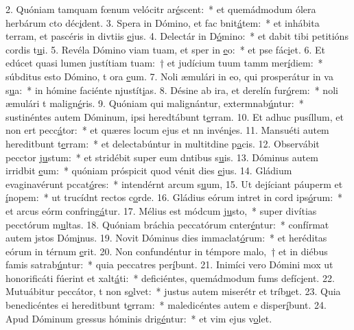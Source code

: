2. Quóniam tamquam fœnum velócitr ar\uline{é}scent:~* et quemádmodum ólera herbárum cto déc\uline{i}dent.
3. Spera in Dómino, et fac bnit\uline{á}tem:~* et inhábita terram, et pascéris in divtiis \uline{e}jus.
4. Delectár in D\uline{ó}mino:~* et dabit tibi petitións cordis t\uline{u}i.
5. Revéla Dómino viam tuam, et sper in \uline{e}o:~* et pse fác\uline{i}et.
6. Et edúcet quasi lumen justítiam tuam:~† et judícium tuum tamm mer\uline{í}diem:~* súbditus esto Dómino, t ora \uline{e}um.
7. Noli æmulári in eo, qui prosperátur in va s\uline{u}a:~* in hómine faciénte njustít\uline{i}as.
8. Désine ab ira, et derelín fur\uline{ó}rem:~* noli æmulári t malign\uline{é}ris.
9. Quóniam qui malignántur, extermnab\uline{ú}ntur:~* sustinéntes autem Dóminum, ipsi heredtábunt t\uline{e}rram.
10. Et adhuc pusíllum, et non ert pecc\uline{á}tor:~* et quæres locum ejus et nn invén\uline{i}es.
11. Mansuéti autem hereditbunt t\uline{e}rram:~* et delectabúntur in multitdine p\uline{a}cis.
12. Observábit pecctor j\uline{u}stum:~* et stridébit super eum dntibus s\uline{u}is.
13. Dóminus autem irridbit \uline{e}um:~* quóniam próspicit quod vénit dies \uline{e}jus.
14. Gládium evaginavérunt pccat\uline{ó}res:~* intendérnt arcum s\uline{u}um,
15. Ut dejíciant páuperm et \uline{í}nopem:~* ut trucídnt rectos c\uline{o}rde.
16. Gládius eórum intret in cord ips\uline{ó}rum:~* et arcus eórm confring\uline{á}tur.
17. Mélius est módcum j\uline{u}sto,~* super divítias pecctórum m\uline{u}ltas.
18. Quóniam bráchia peccatórum cnter\uline{é}ntur:~* confírmat autem jstos Dóm\uline{i}nus.
19. Novit Dóminus dies immaclat\uline{ó}rum:~* et heréditas eórum in térnum \uline{e}rit.
20. Non confundéntur in témpore malo,~† et in diébus famis satrab\uline{ú}ntur:~* quia peccatres per\uline{í}bunt.
21. Inimíci vero Dómini mox ut honorificáti fúerint et xalt\uline{á}ti:~* deficiéntes, quemádmodum fums defíc\uline{i}ent.
22. Mutuábitur peccátor, t non s\uline{o}lvet:~* justus autem miserétr et tríb\uline{u}et.
23. Quia benedicéntes ei hereditbunt t\uline{e}rram:~* maledicéntes autem e disper\uline{í}bunt.
24. Apud Dóminum gressus hóminis drig\uline{é}ntur:~* et vim ejus v\uline{o}let.
